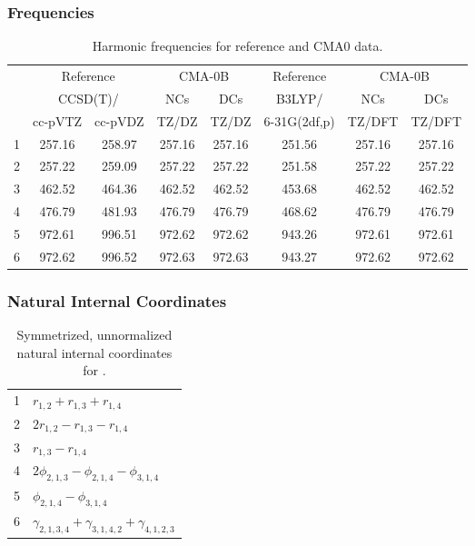 \documentclass[10pt,oneside]{article}
\begin{document}
\clearpage

\subsubsection*{Frequencies}
\begin{table}[h!]
\centering
\caption{Harmonic frequencies for reference and CMA0 data.}
\begin{tabular}{cccccccc}
\toprule
{} & \multicolumn{2}{c}{Reference} & \multicolumn{2}{c}{CMA-0B} &    Reference & \multicolumn{2}{c}{CMA-0B} \\
{} & \multicolumn{2}{c}{CCSD(T)/} &    NCs &    DCs &       B3LYP/ &    NCs &    DCs \\
{} &   cc-pVTZ & cc-pVDZ &  TZ/DZ &  TZ/DZ & 6-31G(2df,p) & TZ/DFT & TZ/DFT \\
\midrule
1 &    257.16 &  258.97 & 257.16 & 257.16 &       251.56 & 257.16 & 257.16 \\
2 &    257.22 &  259.09 & 257.22 & 257.22 &       251.58 & 257.22 & 257.22 \\
3 &    462.52 &  464.36 & 462.52 & 462.52 &       453.68 & 462.52 & 462.52 \\
4 &    476.79 &  481.93 & 476.79 & 476.79 &       468.62 & 476.79 & 476.79 \\
5 &    972.61 &  996.51 & 972.62 & 972.62 &       943.26 & 972.61 & 972.61 \\
6 &    972.62 &  996.52 & 972.63 & 972.63 &       943.27 & 972.62 & 972.62 \\
\bottomrule
\end{tabular}
\end{table}

\clearpage

\subsubsection*{Natural Internal Coordinates}
\begin{table}[h!]
\centering
\caption{Symmetrized, unnormalized natural internal coordinates for .}
\small
\begin{tabular}{ll}
  1   & $r_{1,2} + r_{1,3} + r_{1,4}$ \\
  2   & $2r_{1,2} - r_{1,3} - r_{1,4}$ \\
  3   & $r_{1,3} - r_{1,4}$ \\
  4   & $2\phi_{2,1,3} - \phi_{2,1,4} - \phi_{3,1,4}$ \\
  5   & $\phi_{2,1,4} - \phi_{3,1,4}$ \\
  6   & $\gamma_{2,1,3,4} + \gamma_{3,1,4,2} + \gamma_{4,1,2,3}$ \\
\end{tabular}
\end{table}
\end{document}
